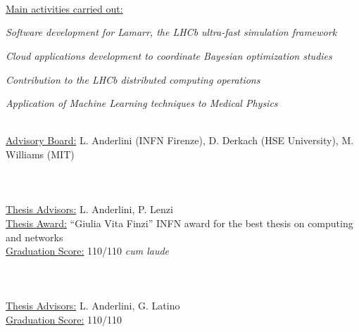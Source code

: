 \begin{cvcontent}
  \\ [0.5mm]
  \\ [1.5mm]
  \\ [1.5mm]
  {\normalsize \color{maincolor} \ul{Main activities carried out:}\\ [1.5mm]
  \begin{itemize*}[label=\textcolor{iconcolor}{\textbullet}]
    \item \emph{Software development for Lamarr, the LHCb ultra-fast simulation framework}\\ [0.5mm]
    \item \emph{Cloud applications development to coordinate Bayesian optimization studies}\\ [0.5mm]
    \item \emph{Contribution to the LHCb distributed computing operations}\\ [0.5mm]
    \item \emph{Application of Machine Learning techniques to Medical Physics}
  \end{itemize*}}\\ [1.5mm]
  \ul{Advisory Board:} L. Anderlini (INFN Firenze), D. Derkach (HSE University), M. Williams (MIT)
  \\ [5mm]
  \\ [0.5mm]
  \\ [1.5mm]
  \\ [1.5mm]
  \ul{Thesis Advisors:} L. Anderlini, P. Lenzi\\ [1.5mm]
  \ul{Thesis Award:} ``Giulia Vita Finzi'' INFN award for the best thesis on computing and networks\\ [1.5mm]
  \ul{Graduation Score:} 110/110 \emph{cum laude}
  \\ [5mm]
  \\ [0.5mm]
  \\ [1.5mm]
  \\ [1.5mm]
  \ul{Thesis Advisors:} L. Anderlini, G. Latino\\ [1.5mm]
  \ul{Graduation Score:} 110/110
\end{cvcontent}